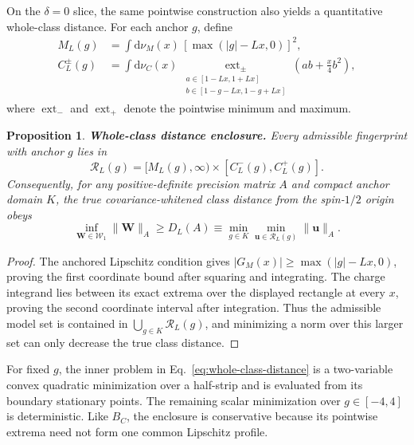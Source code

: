 \documentclass[12pt]{iopjournal}
\newcommand{\dd}{\mathrm d}
\newtheorem{proposition}{Proposition}[section]
\theoremstyle{definition}
\theoremstyle{remark}
\begin{document}
On the $\delta=0$ slice, the same pointwise construction also yields a quantitative whole-class distance. For each anchor $g$, define
\begin{align}
M_L(g)&=\int\dd\nu_M(x)\,[\max(|g|-Lx,0)]^2,
\label{eq:magnetic-floor}\\
C_L^\pm(g)&=\int\dd\nu_C(x)\,
\underset{\substack{a\in[1-Lx,1+Lx]\\
b\in[1-g-Lx,1-g+Lx]}}{\operatorname{ext}_{\pm}}
\left(ab+\frac{x}{4}b^2\right),
\label{eq:charge-range}
\end{align}
where $\operatorname{ext}_{-}$ and $\operatorname{ext}_{+}$ denote the pointwise minimum and maximum.

\begin{proposition}
\textbf{Whole-class distance enclosure.}
\label{prop:distance-enclosure}
Every admissible fingerprint with anchor $g$ lies in
\begin{equation}
\mathcal R_L(g)=[M_L(g),\infty)\times[C_L^-(g),C_L^+(g)].
\end{equation}
Consequently, for any positive-definite precision matrix $A$ and compact anchor domain $K$, the true covariance-whitened class distance from the spin-$1/2$ origin obeys
\begin{equation}
\inf_{\bm W\in\mathcal W_1}\|\bm W\|_A
\ge D_L(A)\equiv
\min_{g\in K}\min_{\bm u\in\mathcal R_L(g)}\|\bm u\|_A.
\label{eq:whole-class-distance}
\end{equation}
\end{proposition}
\begin{proof}
The anchored Lipschitz condition gives $|G_M(x)|\ge\max(|g|-Lx,0)$, proving the first coordinate bound after squaring and integrating.  The charge integrand lies between its exact extrema over the displayed rectangle at every $x$, proving the second coordinate interval after integration.  Thus the admissible model set is contained in $\bigcup_{g\in K}\mathcal R_L(g)$, and minimizing a norm over this larger set can only decrease the true class distance.
\end{proof}

For fixed $g$, the inner problem in Eq.~\eqref{eq:whole-class-distance} is a two-variable convex quadratic minimization over a half-strip and is evaluated from its boundary stationary points.  The remaining scalar minimization over $g\in[-4,4]$ is deterministic.  Like $B_C$, the enclosure is conservative because its pointwise extrema need not form one common Lipschitz profile.
\end{document}
